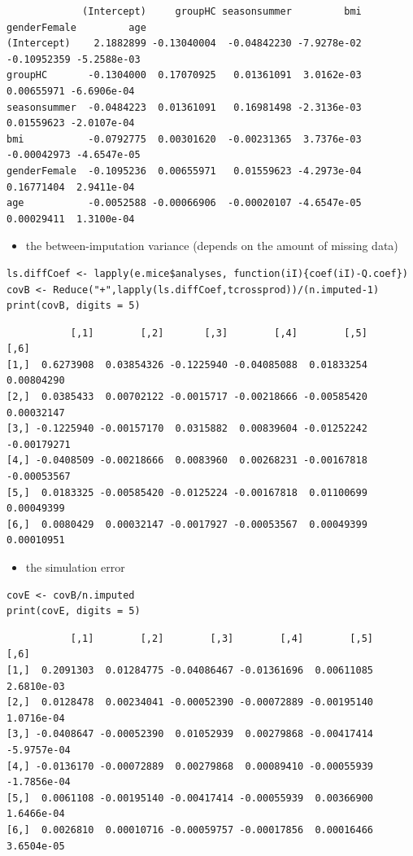 \documentclass[12pt]{article}
\begin{document}
\begin{verbatim}
             (Intercept)     groupHC seasonsummer         bmi genderFemale         age
(Intercept)    2.1882899 -0.13040004  -0.04842230 -7.9278e-02  -0.10952359 -5.2588e-03
groupHC       -0.1304000  0.17070925   0.01361091  3.0162e-03   0.00655971 -6.6906e-04
seasonsummer  -0.0484223  0.01361091   0.16981498 -2.3136e-03   0.01559623 -2.0107e-04
bmi           -0.0792775  0.00301620  -0.00231365  3.7376e-03  -0.00042973 -4.6547e-05
genderFemale  -0.1095236  0.00655971   0.01559623 -4.2973e-04   0.16771404  2.9411e-04
age           -0.0052588 -0.00066906  -0.00020107 -4.6547e-05   0.00029411  1.3100e-04
\end{verbatim}


\begin{itemize}
\item the between-imputation variance (depends on the amount of missing data)
\end{itemize}
\lstset{language=r,label= ,caption= ,captionpos=b,numbers=none}
\begin{lstlisting}
ls.diffCoef <- lapply(e.mice$analyses, function(iI){coef(iI)-Q.coef})
covB <- Reduce("+",lapply(ls.diffCoef,tcrossprod))/(n.imputed-1)
print(covB, digits = 5)
\end{lstlisting}

\begin{verbatim}
           [,1]        [,2]       [,3]        [,4]        [,5]        [,6]
[1,]  0.6273908  0.03854326 -0.1225940 -0.04085088  0.01833254  0.00804290
[2,]  0.0385433  0.00702122 -0.0015717 -0.00218666 -0.00585420  0.00032147
[3,] -0.1225940 -0.00157170  0.0315882  0.00839604 -0.01252242 -0.00179271
[4,] -0.0408509 -0.00218666  0.0083960  0.00268231 -0.00167818 -0.00053567
[5,]  0.0183325 -0.00585420 -0.0125224 -0.00167818  0.01100699  0.00049399
[6,]  0.0080429  0.00032147 -0.0017927 -0.00053567  0.00049399  0.00010951
\end{verbatim}


\begin{itemize}
\item the simulation error
\end{itemize}
\lstset{language=r,label= ,caption= ,captionpos=b,numbers=none}
\begin{lstlisting}
covE <- covB/n.imputed
print(covE, digits = 5)
\end{lstlisting}

\begin{verbatim}
           [,1]        [,2]        [,3]        [,4]        [,5]        [,6]
[1,]  0.2091303  0.01284775 -0.04086467 -0.01361696  0.00611085  2.6810e-03
[2,]  0.0128478  0.00234041 -0.00052390 -0.00072889 -0.00195140  1.0716e-04
[3,] -0.0408647 -0.00052390  0.01052939  0.00279868 -0.00417414 -5.9757e-04
[4,] -0.0136170 -0.00072889  0.00279868  0.00089410 -0.00055939 -1.7856e-04
[5,]  0.0061108 -0.00195140 -0.00417414 -0.00055939  0.00366900  1.6466e-04
[6,]  0.0026810  0.00010716 -0.00059757 -0.00017856  0.00016466  3.6504e-05
\end{verbatim}
\end{document}
